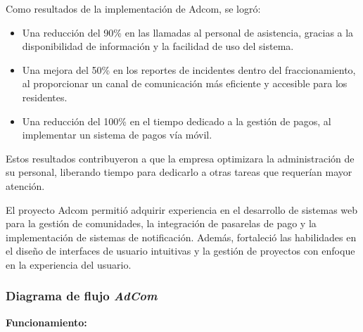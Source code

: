 \documentclass[protocolo.tex]{subfiles}
\begin{document}
Como resultados de la implementación de Adcom, se logró:

\begin{itemize}
\item Una reducción del 90\% en las llamadas al personal de asistencia,  gracias a la disponibilidad de información y la  facilidad  de  uso  del  sistema.
\item Una mejora del 50\% en los reportes de incidentes dentro del fraccionamiento,  al  proporcionar  un  canal  de  comunicación  más  eficiente  y  accesible  para  los  residentes.
\item Una reducción del 100\% en el tiempo dedicado a la gestión de pagos,  al  implementar  un  sistema  de  pagos  vía  móvil.
\end{itemize}

Estos resultados contribuyeron a que la empresa  optimizara la administración de su personal, liberando tiempo para dedicarlo a otras tareas que requerían  mayor  atención.\vspace{4mm}

El proyecto Adcom permitió adquirir experiencia en el desarrollo de sistemas web para la gestión de comunidades,  la integración de pasarelas de pago y la  implementación  de  sistemas  de  notificación.  Además,  fortaleció  las  habilidades  en  el  diseño  de  interfaces  de  usuario  intuitivas  y  la  gestión  de  proyectos  con  enfoque  en  la  experiencia  del  usuario.

\subsubsection{Diagrama de flujo \textit{AdCom}} 

\textbf{Funcionamiento:}
\end{document}
